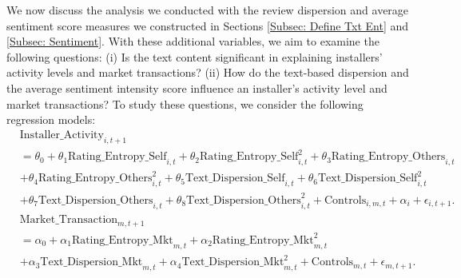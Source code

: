 \documentclass[msom,blindrev]{informs3}
\begin{document}
We now discuss the analysis we conducted with the review dispersion and average sentiment score measures we constructed in Sections \ref{Subsec: Define Txt Ent} and \ref{Subsec: Sentiment}. With these additional variables, we aim to examine the following questions: (i) Is the text content significant in explaining installers' activity levels and market transactions? (ii) How do the text-based dispersion and the average sentiment intensity score influence an installer's activity level and market transactions? %
To study these questions, we consider the following regression models:
\begin{align}  \nonumber
& \text{Installer\_Activity}_{i,t+1} \\ \nonumber
& = \theta_{0}+ \theta_{1} \text{Rating\_Entropy\_Self}_{i,t}+ \theta_{2} \text{Rating\_Entropy\_Self}_{i,t}^ {2} + \theta_{3} \text{Rating\_Entropy\_Others}_{i,t} \\ \nonumber
& + \theta_{4} \text{Rating\_Entropy\_Others}_{i,t}^{2} + \theta_{5} \text{Text\_Dispersion\_Self}_{i,t}+  \theta_{6}  \text{Text\_Dispersion\_Self}_{i,t}^ {2}  \\ \label{model_ind_textbased}
&+ \theta_{7}  \text{Text\_Dispersion\_Others}_{i,t} + \theta_{8} \text{Text\_Dispersion\_Others}_{i,t}^{2}  + \text{Controls}_{i,m,t}+ \alpha_{i} + \epsilon_{i,t+1}.\\ \nonumber
   & \text{Market\_Transaction}_{m,t+1} \\ \nonumber
   & =  \alpha_{0} + \alpha_{1} \text{Rating\_Entropy\_Mkt}_{m,t}+  \alpha_{2} \text{Rating\_Entropy\_Mkt}_{m,t}^2 \\ \label{reg: market-level-textbased}
   &+ \alpha_{3} \text{Text\_Dispersion\_Mkt}_{m,t}+ \alpha_{4} \text{Text\_Dispersion\_Mkt}_{m,t}^2  + \text{Controls}_{m,t}  + \epsilon_{m,t+1}.
\end{align}
\end{document}

